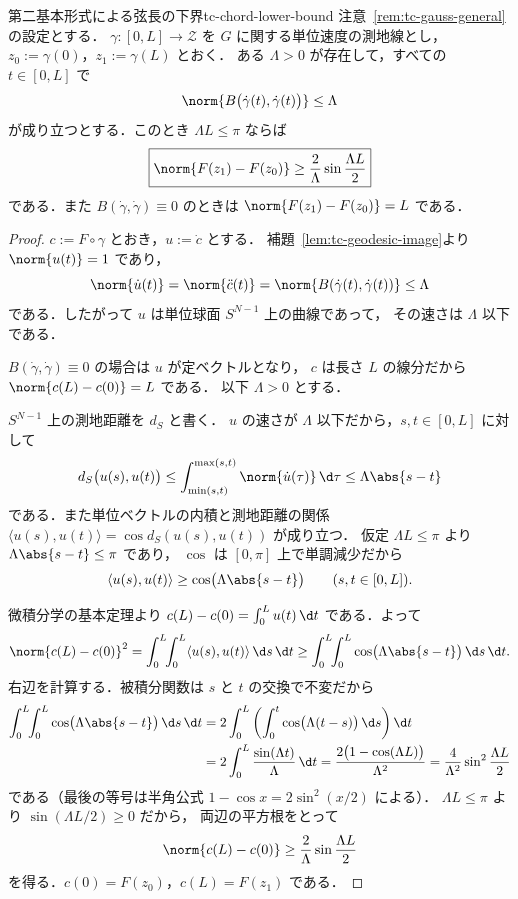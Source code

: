 \begin{theorem}{第二基本形式による弦長の下界}{tc-chord-lower-bound}
  注意~\ref{rem:tc-gauss-general}の設定とする．
  $\gamma\colon[0,L]\to\mathcal{Z}$ を $G$ に関する単位速度の測地線とし，
  $z_0:=\gamma(0)$，$z_1:=\gamma(L)$ とおく．
  ある $\Lambda>0$ が存在して，すべての $t\in[0,L]$ で
  \[
    \norm{B\bigl(\dot\gamma(t),\dot\gamma(t)\bigr)}\leq\Lambda
  \]
  が成り立つとする．このとき $\Lambda L\leq\pi$ ならば
  \[
    \boxed{
      \norm{F(z_1)-F(z_0)}
      \geq\frac{2}{\Lambda}\sin\frac{\Lambda L}{2}
    }
  \]
  である．また $B(\dot\gamma,\dot\gamma)\equiv0$ のときは
  $\norm{F(z_1)-F(z_0)}=L$ である．
\end{theorem}

\begin{proof}
  $c:=F\circ\gamma$ とおき，$u:=\dot c$ とする．
  補題~\ref{lem:tc-geodesic-image}より $\norm{u(t)}=1$ であり，
  \[
    \norm{\dot u(t)}=\norm{\ddot c(t)}
    =\norm{B(\dot\gamma(t),\dot\gamma(t))}\leq\Lambda
  \]
  である．したがって $u$ は単位球面 $S^{N-1}$ 上の曲線であって，
  その速さは $\Lambda$ 以下である．

  $B(\dot\gamma,\dot\gamma)\equiv0$ の場合は $u$ が定ベクトルとなり，
  $c$ は長さ $L$ の線分だから $\norm{c(L)-c(0)}=L$ である．
  以下 $\Lambda>0$ とする．

  $S^{N-1}$ 上の測地距離を $d_{S}$ と書く．
  $u$ の速さが $\Lambda$ 以下だから，$s,t\in[0,L]$ に対して
  \[
    d_{S}\bigl(u(s),u(t)\bigr)
    \leq\int_{\min(s,t)}^{\max(s,t)}\norm{\dot u(\tau)}\,\d\tau
    \leq\Lambda\abs{s-t}
  \]
  である．また単位ベクトルの内積と測地距離の関係
  $\langle u(s),u(t)\rangle=\cos d_{S}(u(s),u(t))$ が成り立つ．
  仮定 $\Lambda L\leq\pi$ より $\Lambda\abs{s-t}\leq\pi$ であり，
  $\cos$ は $[0,\pi]$ 上で単調減少だから
  \[
    \langle u(s),u(t)\rangle\geq\cos\bigl(\Lambda\abs{s-t}\bigr)
    \qquad(s,t\in[0,L]).
  \]

  微積分学の基本定理より $c(L)-c(0)=\int_0^Lu(t)\,\d t$ である．よって
  \[
    \norm{c(L)-c(0)}^2
    =\int_0^L\!\!\int_0^L\langle u(s),u(t)\rangle\,\d s\,\d t
    \geq\int_0^L\!\!\int_0^L\cos\bigl(\Lambda\abs{s-t}\bigr)\,\d s\,\d t .
  \]
  右辺を計算する．被積分関数は $s$ と $t$ の交換で不変だから
  \[
    \begin{aligned}
      \int_0^L\!\!\int_0^L\cos\bigl(\Lambda\abs{s-t}\bigr)\,\d s\,\d t
      &=2\int_0^L\left(\int_0^t\cos\bigl(\Lambda(t-s)\bigr)\,\d s\right)\d t\\
      &=2\int_0^L\frac{\sin(\Lambda t)}{\Lambda}\,\d t
       =\frac{2\bigl(1-\cos(\Lambda L)\bigr)}{\Lambda^2}
       =\frac{4}{\Lambda^2}\sin^2\frac{\Lambda L}{2}
    \end{aligned}
  \]
  である（最後の等号は半角公式 $1-\cos x=2\sin^2(x/2)$ による）．
  $\Lambda L\leq\pi$ より $\sin(\Lambda L/2)\geq0$ だから，
  両辺の平方根をとって
  \[
    \norm{c(L)-c(0)}\geq\frac{2}{\Lambda}\sin\frac{\Lambda L}{2}
  \]
  を得る．$c(0)=F(z_0)$，$c(L)=F(z_1)$ である．
\end{proof}

